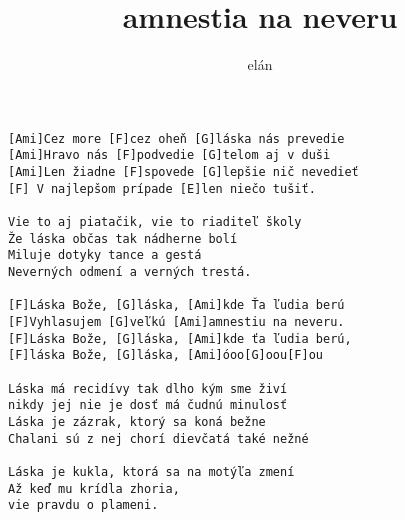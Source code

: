 \author{elán}
\title{amnestia na neveru}
\maketitle
\begin{verbatim}
[Ami]Cez more [F]cez oheň [G]láska nás prevedie 
[Ami]Hravo nás [F]podvedie [G]telom aj v duši 
[Ami]Len žiadne [F]spovede [G]lepšie nič nevedieť 
[F] V najlepšom prípade [E]len niečo tušiť. 

Vie to aj piatačik, vie to riaditeľ školy 
Že láska občas tak nádherne bolí 
Miluje dotyky tance a gestá 
Neverných odmení a verných trestá. 

[F]Láska Bože, [G]láska, [Ami]kde Ťa ľudia berú 
[F]Vyhlasujem [G]veľkú [Ami]amnestiu na neveru. 
[F]Láska Bože, [G]láska, [Ami]kde ťa ľudia berú, 
[F]láska Bože, [G]láska, [Ami]óoo[G]oou[F]ou 

Láska má recidívy tak dlho kým sme živí 
nikdy jej nie je dosť má čudnú minulosť 
Láska je zázrak, ktorý sa koná bežne 
Chalani sú z nej chorí dievčatá také nežné 

Láska je kukla, ktorá sa na motýľa zmení 
Až keď mu krídla zhoria, 
vie pravdu o plameni.
\end{verbatim}
